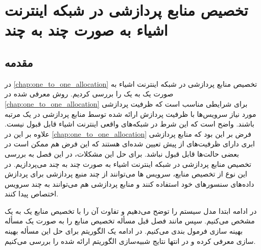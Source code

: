 \chapter{تخصیص منابع پردازشی در شبکه اینترنت اشیاء به صورت چند به چند}\label{Chap:many_to_many_allocation}
  \thispagestyle{empty}
  \section{مقدمه}
    در \cref{chap:one_to_one_allocation} تخصیص منابع پردازشی در شبکه اینترنت اشیاء به صورت یک به یک را بررسی کردیم.
    روش معرفی شده در \cref{chap:one_to_one_allocation} برای شرایطی مناسب است که ظرفیت پردازشی مورد نیاز سرویس‌ها با ظرفیت پردازش ارائه شده توسط منابع پردازشی در یک مرتبه باشند.
    واضح است که این شرط در شبکه‌‌های واقعی اینترنت اشیاء قابل قبول نیست.
    علاوه بر این در \cref{chap:one_to_one_allocation} فرض بر این بود که منابع پردازشی ابری دارای ظرفیت‌های از پیش تعیین شده‌ای هستند که این فرض هم ممکن است در بعضی حالت‌ها قابل قبول نباشد.
    برای حل این مشکلات،‌ در این فصل به بررسی تخصیص منابع پردازشی در شبکه اینترنت اشیاء به صورت چند به چند می‌پردازیم.
    در این نوع از تخصیص منابع، سرویس ها می‌توانند از چند منبع پردازشی برای پردازش داده‌های سنسور‌های خود استفاده کنند و منابع پردازشی هم می‌توانند به چند سرویس اختصاص پیدا کنند.

    در ادامه ابتدا مدل سیستم را توضح می‌دهیم و تفاوت آن را با تخصیص منابع یک به یک مشخص می‌کنیم.
    سپس مانند فصل قبل مسأله تخصیص منابع را به صورت یک مسأله بهینه سازی فرمول بندی می‌کنیم.
    در ادامه یک الگوریتم برای حل این مسأله بهینه سازی معرفی کرده و در انتها نتایج شبیه‌سازی الگوریتم ارائه شده را بررسی می‌کنیم.
